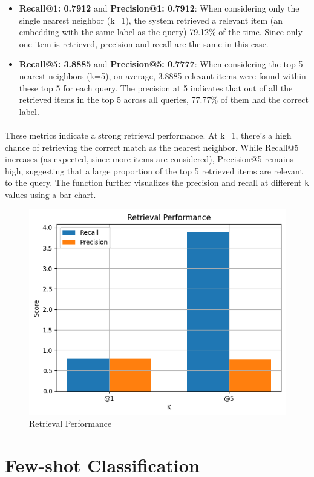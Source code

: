 \documentclass{CUP-JNL-DTM}
\theoremstyle{definition}
\numberwithin{equation}{section}
\begin{document}
\begin{itemize}
    \item \textbf{Recall@1: 0.7912} and \textbf{Precision@1: 0.7912}: When considering only the single nearest neighbor (k=1), the system retrieved a relevant item (an embedding with the same label as the query) 79.12\% of the time. Since only one item is retrieved, precision and recall are the same in this case.
    \item \textbf{Recall@5: 3.8885} and \textbf{Precision@5: 0.7777}: When considering the top 5 nearest neighbors (k=5), on average, 3.8885 relevant items were found within these top 5 for each query. The precision at 5 indicates that out of all the retrieved items in the top 5 across all queries, 77.77\% of them had the correct label.
\end{itemize}
\paragraph{}These metrics indicate a strong retrieval performance. At k=1, there's a high chance of retrieving the correct match as the nearest neighbor. While Recall@5 increases (as expected, since more items are considered), Precision@5 remains high, suggesting that a large proportion of the top 5 retrieved items are relevant to the query. The function further visualizes the precision and recall at different \verb|k| values using a bar chart.

\begin{figure}[ht]
    \centering
    \includegraphics[width=0.6\linewidth]{retrivals.png}
    \caption{Retrieval Performance}
    \label{fig:enter-label}
\end{figure}

\section{Few-shot Classification}
\end{document}

